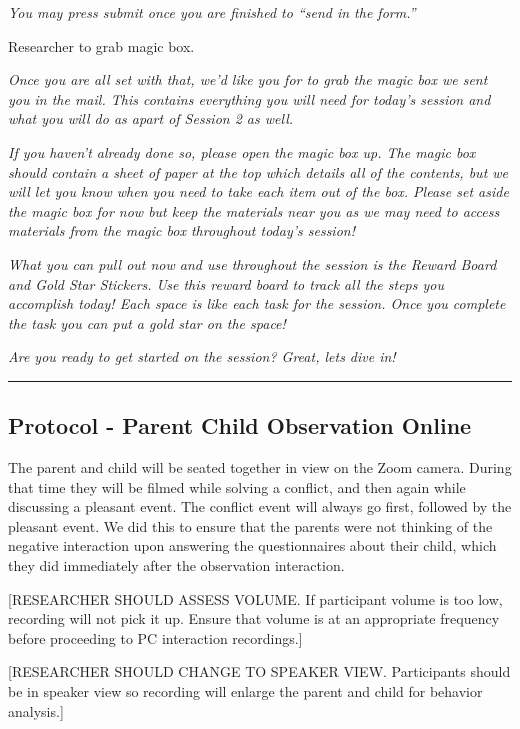 \documentclass[]{book}
\begin{document}
\emph{You may press submit once you are finished to ``send in the form.''}

Researcher to grab magic box.

\emph{Once you are all set with that, we'd like you for to grab the magic box we sent you in the mail. This contains everything you will need for today's session and what you will do as apart of Session 2 as well.}

\emph{If you haven't already done so, please open the magic box up. The magic box should contain a sheet of paper at the top which details all of the contents, but we will let you know when you need to take each item out of the box. Please set aside the magic box for now but keep the materials near you as we may need to access materials from the magic box throughout today's session!}

\emph{What you can pull out now and use throughout the session is the Reward Board and Gold Star Stickers. Use this reward board to track all the steps you accomplish today! Each space is like each task for the session. Once you complete the task you can put a gold star on the space!}

\emph{Are you ready to get started on the session? Great, lets dive in!}

\begin{center}\rule{0.5\linewidth}{0.5pt}\end{center}

\hypertarget{protocol---parent-child-observation-online}{%
\subsection{Protocol - Parent Child Observation Online}\label{protocol---parent-child-observation-online}}

The parent and child will be seated together in view on the Zoom camera. During that time they will be filmed while solving a conflict, and then again while discussing a pleasant event. The conflict event will always go first, followed by the pleasant event. We did this to ensure that the parents were not thinking of the negative interaction upon answering the questionnaires about their child, which they did immediately after the observation interaction.

{[}RESEARCHER SHOULD ASSESS VOLUME. If participant volume is too low, recording will not pick it up. Ensure that volume is at an appropriate frequency before proceeding to PC interaction recordings.{]}

{[}RESEARCHER SHOULD CHANGE TO SPEAKER VIEW. Participants should be in speaker view so recording will enlarge the parent and child for behavior analysis.{]}
\end{document}
